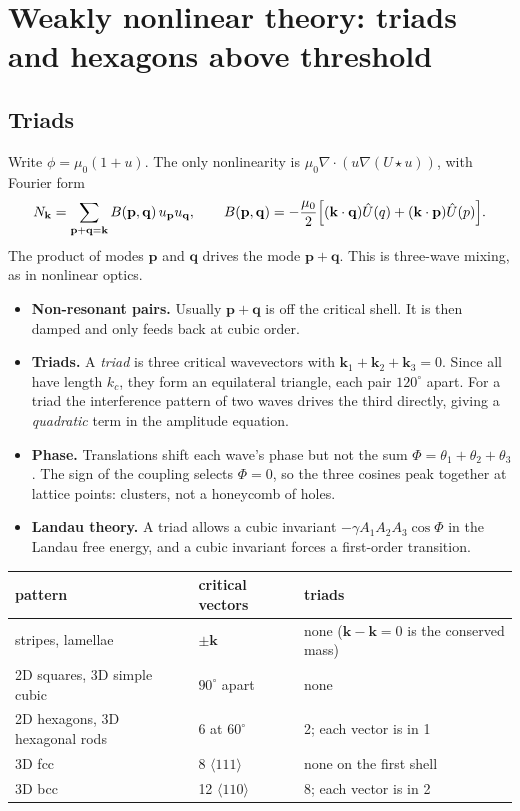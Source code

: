 \documentclass[11pt]{article}
\newcommand{\Uh}{\hat U}
\begin{document}
\section{Weakly nonlinear theory: triads and hexagons above threshold}\label{sec:wnl}

\subsection{Triads}
Write $\phi=\mu_0(1+u)$. The only nonlinearity is
$\mu_0\nabla\cdot(u\nabla(U\star u))$, with Fourier form
\begin{equation}
  N_{\mathbf k} = \sum_{\mathbf p+\mathbf q=\mathbf k} B(\mathbf p,\mathbf q)\,u_{\mathbf p}u_{\mathbf q},
  \qquad
  B(\mathbf p,\mathbf q) = -\frac{\mu_0}{2}\Bigl[(\mathbf k\cdot\mathbf q)\Uh(q)
     + (\mathbf k\cdot\mathbf p)\Uh(p)\Bigr].
\end{equation}
The product of modes $\mathbf p$ and $\mathbf q$ drives the mode
$\mathbf p+\mathbf q$. This is three-wave mixing, as in nonlinear optics.
\begin{itemize}
  \item \textbf{Non-resonant pairs.} Usually $\mathbf p+\mathbf q$ is off the
        critical shell. It is then damped and only feeds back at cubic order.
  \item \textbf{Triads.} A \emph{triad} is three critical wavevectors with
        $\mathbf k_1+\mathbf k_2+\mathbf k_3=0$. Since all have length $k_c$,
        they form an equilateral triangle, each pair $120^\circ$ apart. For a
        triad the interference pattern of two waves drives the third directly,
        giving a \emph{quadratic} term in the amplitude equation.
  \item \textbf{Phase.} Translations shift each wave's phase but not the sum
        $\Phi=\theta_1+\theta_2+\theta_3$. The sign of the coupling selects
        $\Phi=0$, so the three cosines peak together at lattice points:
        clusters, not a honeycomb of holes.
  \item \textbf{Landau theory.} A triad allows a cubic invariant
        $-\gamma A_1A_2A_3\cos\Phi$ in the Landau free energy, and a cubic
        invariant forces a first-order transition.
\end{itemize}
\begin{center}
\begin{tabular}{@{}lll@{}}
\toprule
pattern & critical vectors & triads \\
\midrule
stripes, lamellae & $\pm\mathbf k$ & none ($\mathbf k-\mathbf k=0$ is the conserved mass) \\
2D squares, 3D simple cubic & $90^\circ$ apart & none \\
2D hexagons, 3D hexagonal rods & 6 at $60^\circ$ & 2; each vector is in 1 \\
3D fcc & 8 $\langle111\rangle$ & none on the first shell \\
3D bcc & 12 $\langle110\rangle$ & 8; each vector is in 2 \\
\bottomrule
\end{tabular}
\end{center}
\end{document}
